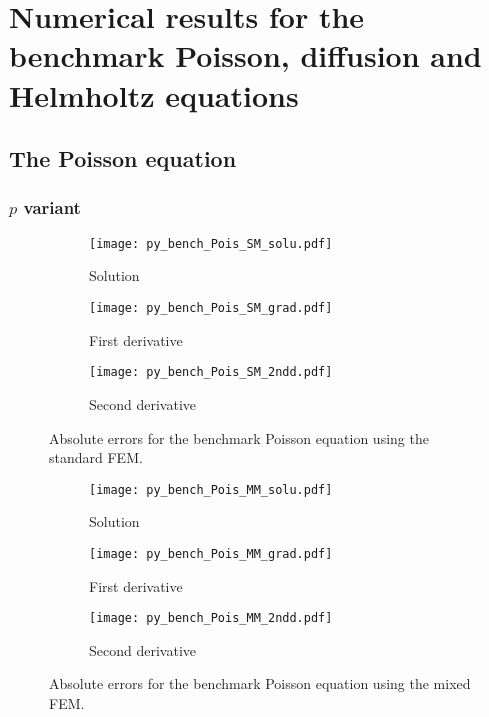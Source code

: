 \documentclass[review,3p]{elsarticle}
\begin{document}
\section{Numerical results for the benchmark Poisson, diffusion and Helmholtz equations}         \label{discretization_error_bench_pois_diff_Helm}
% 
\subsection{The Poisson equation}         \label{discretization_error_bench_pois}

\subsubsection{$p$ variant}

\begin{figure}[!ht]
    \begin{subfigure}{5.5cm}
        \texttt{[image: py\_bench\_Pois\_SM\_solu.pdf]}			%
        \caption{Solution}
        \label{py_bench_Pois_SM_solu}
    \end{subfigure}
    \hspace{-0.2cm}
    \begin{subfigure}{5.5cm}
        \texttt{[image: py\_bench\_Pois\_SM\_grad.pdf]}
        \caption{First derivative}
        \label{py_bench_Pois_SM_grad}
    \end{subfigure}
    \hspace{-0.2cm}
    \begin{subfigure}{5.5cm}
        \texttt{[image: py\_bench\_Pois\_SM\_2ndd.pdf]}
        \caption{Second derivative}
        \label{py_bench_Pois_SM_2ndd}
    \end{subfigure}
\caption{Absolute errors for the benchmark Poisson equation using the standard FEM.}
\label{py_bench_Pois_SM}
\end{figure}

\begin{figure}[!ht]
    \begin{subfigure}{5.5cm}
        \texttt{[image: py\_bench\_Pois\_MM\_solu.pdf]}
        \caption{Solution}
        \label{py_bench_Pois_MM_solu}
    \end{subfigure}
    \hspace{-0.2cm}
    \begin{subfigure}{5.5cm}
        \texttt{[image: py\_bench\_Pois\_MM\_grad.pdf]}
        \caption{First derivative}
        \label{py_bench_Pois_MM_grad}
    \end{subfigure}
    \hspace{-0.2cm}
    \begin{subfigure}{5.5cm}
        \texttt{[image: py\_bench\_Pois\_MM\_2ndd.pdf]}
        \caption{Second derivative}
        \label{py_bench_Pois_MM_2ndd}
    \end{subfigure}
\caption{Absolute errors for the benchmark Poisson equation using the mixed FEM.}
\label{py_bench_Pois_MM}
\end{figure}
\end{document}

